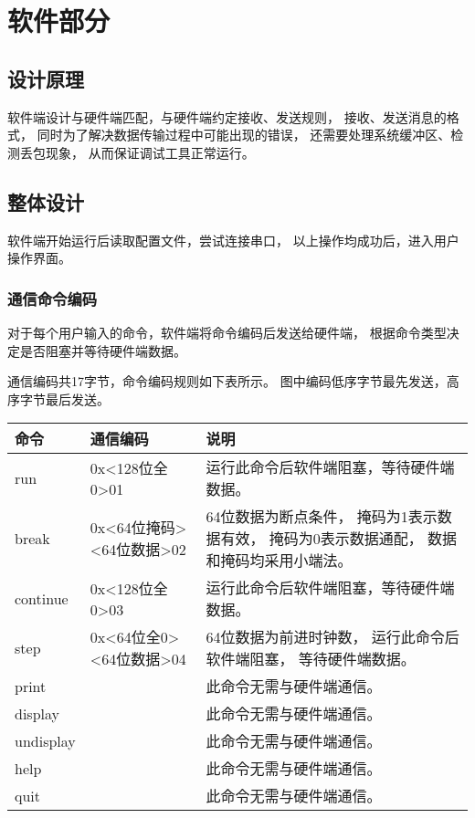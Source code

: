 \section{软件部分}
    \subsection{设计原理}
        软件端设计与硬件端匹配，与硬件端约定接收、发送规则，%
        接收、发送消息的格式，%
        同时为了解决数据传输过程中可能出现的错误，%
        还需要处理系统缓冲区、检测丢包现象，%
        从而保证调试工具正常运行。%
    \subsection{整体设计}
        软件端开始运行后读取配置文件，尝试连接串口，%
        以上操作均成功后，进入用户操作界面。
            
        \subsubsection{通信命令编码}
            对于每个用户输入的命令，软件端将命令编码后发送给硬件端，%
            根据命令类型决定是否阻塞并等待硬件端数据。

            通信编码共17字节，命令编码规则如下表所示。%
            图中编码低序字节最先发送，高序字节最后发送。

            \begin{tabularx}{\textwidth}{llX}
                \toprule
                命令 & 通信编码 & 说明 \\
                \midrule
                run        & 0x<128位全0>01 & 运行此命令后软件端阻塞，等待硬件端数据。 \\
                \midrule
                break      & 0x<64位掩码><64位数据>02 & 64位数据为断点条件，%
                                                        掩码为1表示数据有效，%
                                                        掩码为0表示数据通配，%
                                                        数据和掩码均采用小端法。 \\
                \midrule
                continue   & 0x<128位全0>03 & 运行此命令后软件端阻塞，等待硬件端数据。 \\
                \midrule
                step       & 0x<64位全0><64位数据>04 & 64位数据为前进时钟数，%
                                                       运行此命令后软件端阻塞，%
                                                       等待硬件端数据。 \\
                \midrule
                print      & & 此命令无需与硬件端通信。 \\
                \midrule
                display    & & 此命令无需与硬件端通信。 \\
                \midrule
                undisplay  & & 此命令无需与硬件端通信。 \\
                \midrule
                help       & & 此命令无需与硬件端通信。 \\
                \midrule
                quit       & & 此命令无需与硬件端通信。 \\ 
                \bottomrule
            \end{tabularx}

